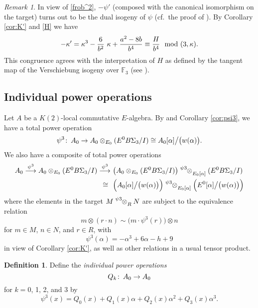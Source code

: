 \documentclass{gtpart}
\theoremstyle{definition}
\newtheorem{defn}[thm]{Definition}
\theoremstyle{remark}
\newtheorem{rmk}[thm]{Remark}
\def\co{\colon\thinspace}
\newcommand{\mb}[1]{\mathbb{#1}}
\newcommand{\BF}{{\mb F}}
\newcommand{\md}{~~{\rm mod}~}
\newcommand{\A}{\alpha}
\newcommand{\K}{\kappa}
\newcommand{\p}{\psi^3}
\begin{document}
\begin{rmk}
\label{rmk:K'}
 In view of \eqref{frob^2}, $-\psi'$ (composed with the canonical 
 isomorphism on the target) turns out to be the dual isogeny of $\psi$ 
 (cf.~the proof of \cite[2.9.4]{KM}).  By Corollary \ref{cor:K'} and 
 \eqref{H} we have 
 \[
  -\K' = \K^3 - \frac{6}{b^2} ~ \K + \frac{a^2 - 8 b}{b^4} \equiv \frac{H}{b^4} \md (3,\K).  
 \]
 This congruence agrees with the interpretation of $H$ as defined by the 
 tangent map of the Verschiebung isogeny over $\BF_3$ (see 
 \cite[12.4.1]{KM}).  
\end{rmk}


\subsection{Individual power operations}

Let $A$ be a $K(2)$-local commutative $E$-algebra.  By \cite[3.23]{cong} 
and Corollary \ref{cor:psi3}, we have a total power operation 
\[
 \p \co A_0 \to A_0 \otimes_{E_0} (E^0 B\Sigma_3 / I) \cong A_0 [\A] \big/ \big( w(\A) \big).  
\]
We also have a composite of total power operations 
\begin{equation}
\label{psi3^2}
\begin{split}
 A_0 \stackrel{\p}{\longrightarrow} A_0 \otimes_{E_0} (E^0 B\Sigma_3 / I) \stackrel{\p}{\longrightarrow} 
 & ~ \big( A_0 \otimes_{E_0} (E^0 B\Sigma_3 / I) \big) \tensor[^\p]{\otimes}{_{E_0 [\A]}} (E^0 B\Sigma_3 / I) \\
 \cong \thinspace \thinspace & ~ \Big( A_0 [\A] \big/ \big( w(\A) \big) \Big) \tensor[^\p]{\otimes}{_{E_0 [\A]}} \Big( E^0 [\A] \big/ \big( w(\A) \big) \Big) 
\end{split}
\end{equation}
where the elements in the target $M \tensor[^\p]{\otimes}{_R} N$ are 
subject to the equivalence relation 
\[
 m \otimes (r \cdot n) \sim \big( m \cdot \p(r) \big) \otimes n 
\]
for $m \in M$, $n \in N$, and $r \in R$, with 
\[
 \p(\A) = -\A^3 + 6 \A - h + 9 
\]
in view of Corollary \ref{cor:K'}, as well as other relations in a usual 
tensor product.  

\begin{defn}
\label{def:Q}
 Define the {\em individual power operations} 
 \[
  Q_k \co A_0 \to A_0 
 \]
 for $k = 0$, 1, 2, and 3 by 
 \[
  \p (x) = Q_0(x) + Q_1(x) \A + Q_2(x) \A^2 + Q_3(x) \A^3.  
 \]
\end{defn}
\end{document}
